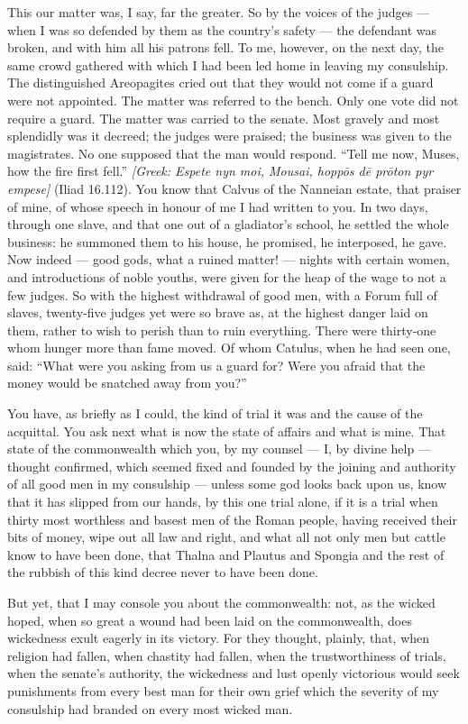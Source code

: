  This our matter was, I say, far the greater. So by the voices of the judges --- when I was so defended by them as the country's safety --- the defendant was broken, and with him all his patrons fell. To me, however, on the next day, the same crowd gathered with which I had been led home in leaving my consulship. The distinguished Areopagites cried out that they would not come if a guard were not appointed. The matter was referred to the bench. Only one vote did not require a guard. The matter was carried to the senate. Most gravely and most splendidly was it decreed; the judges were praised; the business was given to the magistrates. No one supposed that the man would respond. ``Tell me now, Muses, how the fire first fell.'' \textit{[Greek: Espete nyn moi, Mousai, hopp\=os d\=e pr\=oton pyr empese]} (Iliad 16.112). You know that Calvus of the Nanneian estate, that praiser of mine, of whose speech in honour of me I had written to you. In two days, through one slave, and that one out of a gladiator's school, he settled the whole business: he summoned them to his house, he promised, he interposed, he gave. Now indeed --- good gods, what a ruined matter! --- nights with certain women, and introductions of noble youths, were given for the heap of the wage to not a few judges. So with the highest withdrawal of good men, with a Forum full of slaves, twenty-five judges yet were so brave as, at the highest danger laid on them, rather to wish to perish than to ruin everything. There were thirty-one whom hunger more than fame moved. Of whom Catulus, when he had seen one, said: ``What were you asking from us a guard for? Were you afraid that the money would be snatched away from you?''

 You have, as briefly as I could, the kind of trial it was and the cause of the acquittal. You ask next what is now the state of affairs and what is mine. That state of the commonwealth which you, by my counsel --- I, by divine help --- thought confirmed, which seemed fixed and founded by the joining and authority of all good men in my consulship --- unless some god looks back upon us, know that it has slipped from our hands, by this one trial alone, if it is a trial when thirty most worthless and basest men of the Roman people, having received their bits of money, wipe out all law and right, and what all not only men but cattle know to have been done, that Thalna and Plautus and Spongia and the rest of the rubbish of this kind decree never to have been done.

 But yet, that I may console you about the commonwealth: not, as the wicked hoped, when so great a wound had been laid on the commonwealth, does wickedness exult eagerly in its victory. For they thought, plainly, that, when religion had fallen, when chastity had fallen, when the trustworthiness of trials, when the senate's authority, the wickedness and lust openly victorious would seek punishments from every best man for their own grief which the severity of my consulship had branded on every most wicked man.

